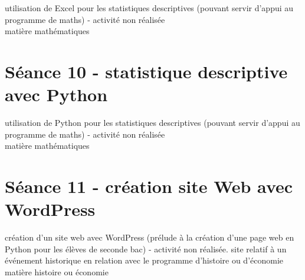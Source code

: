 \documentclass{moncours}
\begin{document}
utilisation de Excel pour les statistiques descriptives (pouvant servir d'appui au programme de maths) - activité non réalisée\\

matière mathématiques

\section{Séance 10 - statistique descriptive avec Python}

utilisation de Python pour les statistiques descriptives (pouvant servir d'appui au programme de maths) - activité non réalisée\\

matière mathématiques

\section{Séance 11 - création site Web avec WordPress}

création d'un site web avec WordPress (prélude à la création d'une page web en Python pour les élèves de seconde bac) - activité non réalisée. site relatif à un événement historique en relation avec le programme d'histoire ou d'économie\\

matière histoire ou économie










\printindex %
\end{document}
